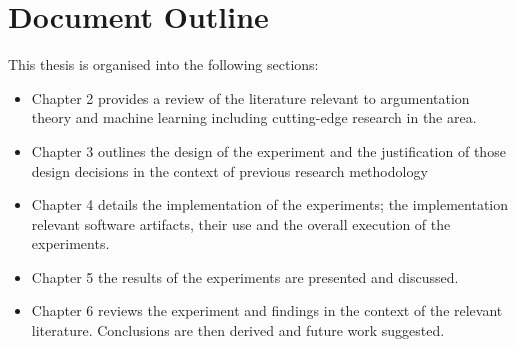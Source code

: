 
\section{Document Outline}

This thesis is organised into the following sections:

\begin{itemize}

  \item Chapter 2 provides a review of the literature relevant to argumentation theory and machine learning including cutting-edge research in the area.
  \item Chapter 3 outlines the design of the experiment and the justification of those design decisions in the context of previous research methodology
  \item Chapter 4 details the implementation of the experiments; the implementation relevant software artifacts, their use and the overall execution of the experiments.
  \item Chapter 5 the results of the experiments are presented and discussed.
  \item Chapter 6 reviews the experiment and findings in the context of the relevant literature. Conclusions are then derived and future work suggested.

\end{itemize}
